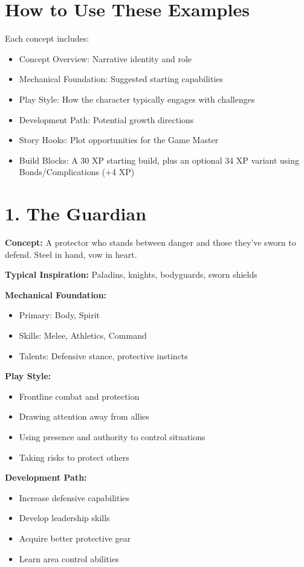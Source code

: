 \documentclass[11pt,twoside,openany]{book}
\begin{document}
\section*{How to Use These Examples} 

Each concept includes:
\begin{itemize}
\item Concept Overview: Narrative identity and role
\item Mechanical Foundation: Suggested starting capabilities
\item Play Style: How the character typically engages with challenges
\item Development Path: Potential growth directions
\item Story Hooks: Plot opportunities for the Game Master
\item Build Blocks: A 30 XP starting build, plus an optional 34 XP variant using Bonds/Complications (+4 XP)
\end{itemize}

\section*{1. The Guardian} 

\textbf{Concept:} A protector who stands between danger and those they've sworn to defend. Steel in hand, vow in heart.

\textbf{Typical Inspiration:} Paladins, knights, bodyguards, sworn shields

\textbf{Mechanical Foundation:}
\begin{itemize}
\item Primary: Body, Spirit
\item Skills: Melee, Athletics, Command
\item Talents: Defensive stance, protective instincts
\end{itemize}

\textbf{Play Style:}
\begin{itemize}
\item Frontline combat and protection
\item Drawing attention away from allies
\item Using presence and authority to control situations
\item Taking risks to protect others
\end{itemize}

\textbf{Development Path:}
\begin{itemize}
\item Increase defensive capabilities
\item Develop leadership skills
\item Acquire better protective gear
\item Learn area control abilities
\end{itemize}
\end{document}
